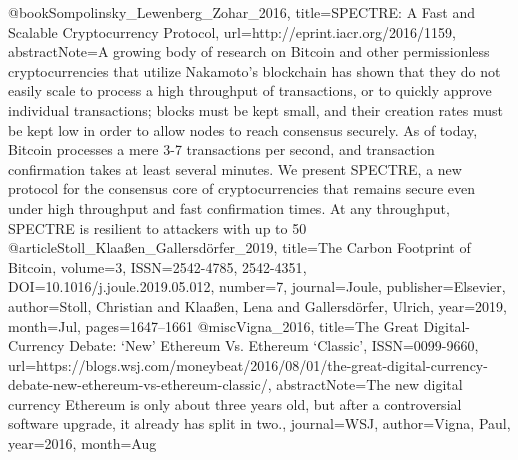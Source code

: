 {{ @book{Sompolinsky_Lewenberg_Zohar_2016, title={SPECTRE: A Fast and Scalable Cryptocurrency Protocol}, url={http://eprint.iacr.org/2016/1159}, abstractNote={A growing body of research on Bitcoin and other permissionless cryptocurrencies that utilize Nakamoto’s blockchain has shown that they do not easily scale to process a high throughput of transactions, or to quickly approve individual transactions; blocks must be kept small, and their creation rates must be kept low in order to allow nodes to reach consensus securely. As of today, Bitcoin processes a mere 3-7 transactions per second, and transaction confirmation takes at least several minutes. We present SPECTRE, a new protocol for the consensus core of cryptocurrencies that remains secure even under high throughput and fast confirmation times. At any throughput, SPECTRE is resilient to attackers with up to 50%
 @article{Stoll_Klaaßen_Gallersdörfer_2019, title={The Carbon Footprint of Bitcoin}, volume={3}, ISSN={2542-4785, 2542-4351}, DOI={10.1016/j.joule.2019.05.012}, number={7}, journal={Joule}, publisher={Elsevier}, author={Stoll, Christian and Klaaßen, Lena and Gallersdörfer, Ulrich}, year={2019}, month={Jul}, pages={1647–1661} }
 @misc{Vigna_2016, title={The Great Digital-Currency Debate: ‘New’ Ethereum Vs. Ethereum ‘Classic’}, ISSN={0099-9660}, url={https://blogs.wsj.com/moneybeat/2016/08/01/the-great-digital-currency-debate-new-ethereum-vs-ethereum-classic/}, abstractNote={The new digital currency Ethereum is only about three years old, but after a controversial software upgrade, it already has split in two.}, journal={WSJ}, author={Vigna, Paul}, year={2016}, month={Aug} }
}}}}
